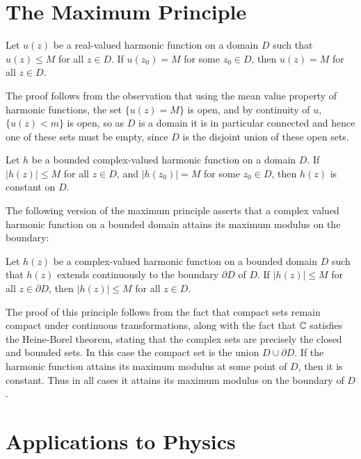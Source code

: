 \section{The Maximum Principle}


\begin{theorem}
    Let $u(z)$ be a real-valued harmonic function on a domain $D$ such that $u(z) \leq M$ for all $z \in D$. If $u(z_0) = M$ for some $z_0 \in D$, then $u(z) = M$ for all $z \in D$.
\end{theorem}

The proof follows from the observation that using the mean value property of harmonic functions, the set $\{u(z) = M\}$ is open, and by continuity of $u$, $\{u(z) < m\}$ is open, so as $D$ is a domain it is in particular connected and hence one of these sets must be empty, since $D$ is the disjoint union of these open sets.


\begin{theorem}
    Let $h$ be a bounded complex-valued harmonic function on a domain $D$. If $|h(z)| \leq M$ for all $z \in D$, and $|h(z_0)| = M$ for some $z_0 \in D$, then $h(z)$ is constant on $D$.
\end{theorem}

The following version of the maximum principle asserts that a complex valued harmonic function on a bounded domain attains its maximum modulus on the boundary:

\begin{theorem}
    Let $h(z)$ be a complex-valued harmonic function on a bounded domain $D$ such that $h(z)$ extends continuously to the boundary $\partial D$ of $D$. If $|h(z)|\leq M$ for all $z \in \partial D$, then $|h(z)|\leq M$ for all $z \in D$.
\end{theorem}

The proof of this principle follows from the fact that compact sets remain compact under continuous transformations, along with the fact that $\mathbb C$ satisfies the Heine-Borel theorem, stating that the complex sets are precisely the closed and bounded sets. In this case the compact set is the union $D\cup \partial D$. If the harmonic function attains its maximum modulus at some point of $D$, then it is constant. Thus in all cases it attains its maximum modulus on the boundary of $D$.




\section{Applications to Physics}

